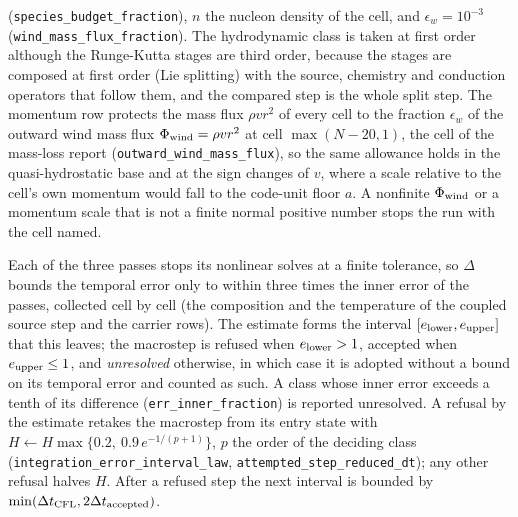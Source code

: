 (\texttt{species\_budget\_fraction}), $n$ the nucleon density of the cell,
and $\epsilon_w = 10^{-3}$ (\texttt{wind\_mass\_flux\_fraction}).  The hydrodynamic class is
taken at first order although the Runge-Kutta stages are third order,
because the stages are composed at first order (Lie splitting) with the
source, chemistry and conduction operators that follow them, and the
compared step is the whole split step.  The momentum row protects the mass
flux $\rho v r^2$ of every cell to the fraction $\epsilon_w$ of the outward
wind mass flux $\Phi_{\rm wind} = \rho v r^2$ at cell $\max(N-20,1)$, the cell
of the mass-loss report (\texttt{outward\_wind\_mass\_flux}), so the same
allowance holds in the quasi-hydrostatic base and at the sign changes of
$v$, where a scale relative to the cell's own momentum would fall to the
code-unit floor $a$.  A nonfinite $\Phi_{\rm wind}$ or a momentum scale that
is not a finite normal positive number stops the run with the cell named.

Each of the three passes stops its nonlinear solves at a finite tolerance,
so $\Delta$ bounds the temporal error only to within three times the inner
error of the passes, collected cell by cell (the composition and the
temperature of the coupled source step and the carrier rows).  The estimate
forms the interval $[e_{\rm lower},e_{\rm upper}]$ that this leaves; the
macrostep is refused when $e_{\rm lower}>1$, accepted when $e_{\rm upper}\le
1$, and \emph{unresolved} otherwise, in which case it is adopted without a
bound on its temporal error and counted as such.  A class whose inner error
exceeds a tenth of its difference (\texttt{err\_inner\_fraction}) is
reported unresolved.  A refusal by the estimate retakes the macrostep from
its entry state with $H \leftarrow H\max\{0.2,\ 0.9\,e^{-1/(p+1)}\}$, $p$ the
order of the deciding class (\texttt{integration\_error\_interval\_law},
\texttt{attempted\_step\_reduced\_dt}); any other refusal halves $H$.  After
a refused step the next interval is bounded by
$\min(\Delta t_{\rm CFL}, 2\Delta t_{\rm accepted})$.

